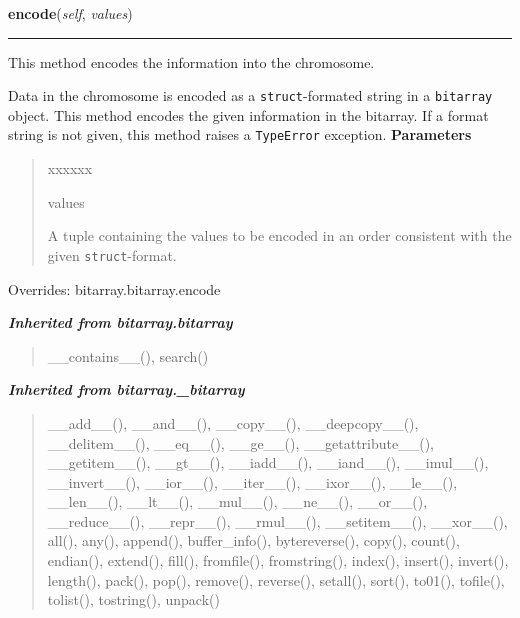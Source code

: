 \hspace{.8\funcindent}\begin{boxedminipage}{\funcwidth}

    \raggedright \textbf{encode}(\textit{self}, \textit{values})

    \vspace{-1.5ex}

    \rule{\textwidth}{0.5\fboxrule}
\setlength{\parskip}{2ex}

This method encodes the information into the chromosome.

Data in the chromosome is encoded as a \texttt{struct}-formated string in a
\texttt{bitarray} object. This method encodes the given information in the
bitarray. If a format string is not given, this method raises a
\texttt{TypeError} exception.
\setlength{\parskip}{1ex}
      \textbf{Parameters}
      \vspace{-1ex}

      \begin{quote}
        \begin{Ventry}{xxxxxx}

          \item[values]


A tuple containing the values to be encoded in an order consistent
with the given \texttt{struct}-format.
        \end{Ventry}

      \end{quote}

      Overrides: bitarray.bitarray.encode

    \end{boxedminipage}


\large{\textbf{\textit{Inherited from bitarray.bitarray}}}

\begin{quote}
\_\_contains\_\_(), search()
\end{quote}

\large{\textbf{\textit{Inherited from bitarray.\_bitarray}}}

\begin{quote}
\_\_add\_\_(), \_\_and\_\_(), \_\_copy\_\_(), \_\_deepcopy\_\_(), \_\_delitem\_\_(), \_\_eq\_\_(), \_\_ge\_\_(), \_\_getattribute\_\_(), \_\_getitem\_\_(), \_\_gt\_\_(), \_\_iadd\_\_(), \_\_iand\_\_(), \_\_imul\_\_(), \_\_invert\_\_(), \_\_ior\_\_(), \_\_iter\_\_(), \_\_ixor\_\_(), \_\_le\_\_(), \_\_len\_\_(), \_\_lt\_\_(), \_\_mul\_\_(), \_\_ne\_\_(), \_\_or\_\_(), \_\_reduce\_\_(), \_\_repr\_\_(), \_\_rmul\_\_(), \_\_setitem\_\_(), \_\_xor\_\_(), all(), any(), append(), buffer\_info(), bytereverse(), copy(), count(), endian(), extend(), fill(), fromfile(), fromstring(), index(), insert(), invert(), length(), pack(), pop(), remove(), reverse(), setall(), sort(), to01(), tofile(), tolist(), tostring(), unpack()
\end{quote}

